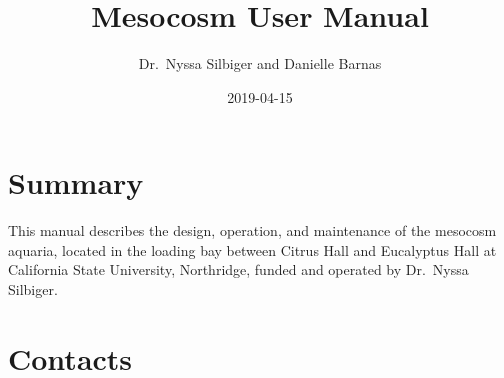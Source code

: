 \documentclass[]{book}
\title{Mesocosm User Manual}
\author{Dr.~Nyssa Silbiger and Danielle Barnas}
\date{2019-04-15}
\begin{document}
\maketitle

{
\setcounter{tocdepth}{1}
\tableofcontents
}
\chapter{Summary}\label{summary}

This manual describes the design, operation, and maintenance of the
mesocosm aquaria, located in the loading bay between Citrus Hall and
Eucalyptus Hall at California State University, Northridge, funded and
operated by Dr.~Nyssa Silbiger.

\chapter{Contacts}\label{contacts}
\end{document}
